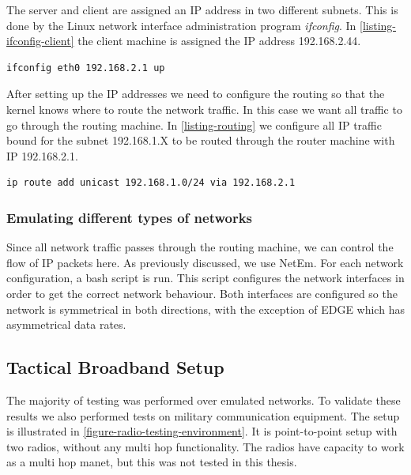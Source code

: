 The server and client are assigned an IP address in two different subnets.
This is done by the Linux network interface administration program
\textit{ifconfig}. In \cref{listing-ifconfig-client} the client machine is
assigned the IP address 192.168.2.44.

\begin{lstlisting}[frame=single, caption="Configuring a network interface of the router", label=listing-ifconfig-client]
ifconfig eth0 192.168.2.1 up
\end{lstlisting}

After setting up the IP addresses we need to configure the routing so that the
kernel knows where to route the network traffic. In this case we want all
traffic to go through the routing machine. In \cref{listing-routing} we
configure all IP traffic bound for the subnet 192.168.1.X to be routed through
the router machine with IP 192.168.2.1.

\begin{lstlisting}[frame=single, caption="Configuring routing rules for the client", label=listing-routing]
ip route add unicast 192.168.1.0/24 via 192.168.2.1
\end{lstlisting}

\subsubsection{Emulating different types of networks}

Since all network traffic passes through the routing machine, we can control the
flow of IP packets here. As previously discussed, we use NetEm.  For each
network configuration, a bash script is run. This script configures the network
interfaces in order to get the correct network behaviour. Both interfaces are
configured so the network is symmetrical in both directions, with the exception
of EDGE which has asymmetrical data rates.

\subsection{Tactical Broadband Setup}

The majority of testing was performed over emulated networks. To validate these
results we also performed tests on military communication equipment. The setup
is illustrated in \cref{figure-radio-testing-environment}. It is point-to-point
setup with two radios, without any multi hop functionality. The radios have
capacity to work as a multi hop \gls{manet}, but this was not tested in this
thesis.

